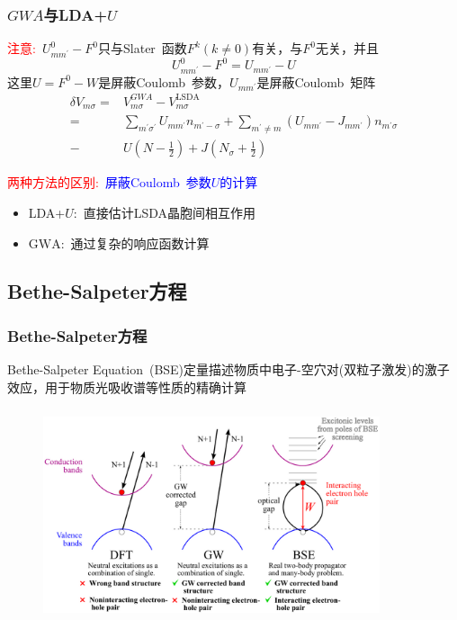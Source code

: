 {\frame
{
	\frametitle{$GWA$与\textrm{LDA+}$U$}
	\textcolor{red}{注意:~}$U_{mm^{\prime}}^0-F^0$只与\textrm{Slater~}函数$F^k(k\neq0)$有关，与$F^0$无关，并且
	\begin{displaymath}
		U_{mm^{\prime}}^0-F^0=U_{mm^{\prime}}-U
	\end{displaymath}
	这里$U=F^0-W$是屏蔽\textrm{Coulomb~}参数，$U_{mm^{\prime}}$是屏蔽\textrm{Coulomb~}矩阵
	\begin{displaymath}
		\begin{aligned}
			\delta V_{m\sigma}=&V_{m\sigma}^{GWA}-V_{m\sigma}^{\mathrm{LSDA}}\\
			=&\sum_{m^{\prime}\sigma^{\prime}}U_{mm^{\prime}}n_{m^{\prime}-\sigma}+\sum_{m^{\prime}\neq m}(U_{mm^{\prime}}-J_{mm^{\prime}})n_{m^{\prime}\sigma}\\
			-&U(N-\frac12)+J(N_{\sigma}+\frac12)
		\end{aligned}
	\end{displaymath}

	\textcolor{red}{两种方法的区别:~}\textcolor{blue}{屏蔽\textrm{Coulomb~}参数$U$的计算}
	\begin{itemize}
		\item \textrm{LDA+}$U$:~直接估计\textrm{LSDA}晶胞间相互作用
		\item $\mathrm{GWA}$:~通过复杂的响应函数计算
	\end{itemize}
}

\subsection{\rm{Bethe-Salpeter}方程}
\frame
{
	\frametitle{\textrm{Bethe-Salpeter}方程}
	\textrm{Bethe-Salpeter Equation~(BSE)}定量描述物质中电子-空穴对(双粒子激发)的激子效应，用于物质光吸收谱等性质的精确计算
\begin{figure}[h!]
\centering
\vspace{-5pt}
\includegraphics[height=2.45in,width=3.90in,viewport=0 0 1000 600,clip]{Figures/BSE_GW_DFT.png}
\label{GW-BSE_GW_DFT}
\end{figure}
}

}
